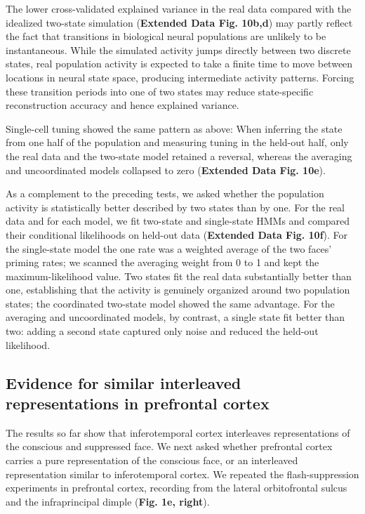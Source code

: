 \documentclass{article}
\begin{document}
The lower cross-validated explained variance in the real data compared with the idealized two-state simulation (\textbf{Extended Data Fig. 10b,d}) may partly reflect the fact that transitions in biological neural populations are unlikely to be instantaneous. While the simulated activity jumps directly between two discrete states, real population activity is expected to take a finite time to move between locations in neural state space, producing intermediate activity patterns. Forcing these transition periods into one of two states may reduce state-specific reconstruction accuracy and hence explained variance.

Single-cell tuning showed the same pattern as above: When inferring the state from one half of the population and measuring tuning in the held-out half, only the real data and the two-state model retained a reversal, whereas the averaging and uncoordinated models collapsed to zero (\textbf{Extended Data Fig. 10e}).

As a complement to the preceding tests, we asked whether the population activity is statistically better described by two states than by one. For the real data and for each model, we fit two-state and single-state HMMs and compared their conditional likelihoods on held-out data (\textbf{Extended Data Fig. 10f}). For the single-state model the one rate was a weighted average of the two faces' priming rates; we scanned the averaging weight from 0 to 1 and kept the maximum-likelihood value. Two states fit the real data substantially better than one, establishing that the activity is genuinely organized around two population states; the coordinated two-state model showed the same advantage. For the averaging and uncoordinated models, by contrast, a single state fit better than two: adding a second state captured only noise and reduced the held-out likelihood.

\subsection*{Evidence for similar interleaved representations in prefrontal cortex}

The results so far show that inferotemporal cortex interleaves representations of the conscious and suppressed face. We next asked whether prefrontal cortex carries a pure representation of the conscious face, or an interleaved representation similar to inferotemporal cortex. We repeated the flash-suppression experiments in prefrontal cortex, recording from the lateral orbitofrontal sulcus and the infraprincipal dimple (\textbf{Fig. 1e, right}).
\end{document}
